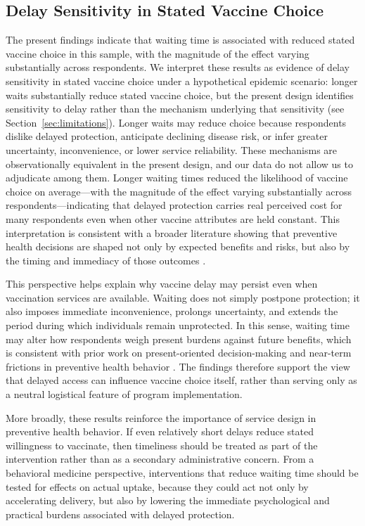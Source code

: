 \documentclass[12pt]{article}
\begin{document}
\subsection{Delay Sensitivity in Stated Vaccine Choice}

The present findings indicate that waiting time is associated with reduced stated vaccine choice in this sample, with the magnitude of the effect varying substantially across respondents. We interpret these results as evidence of delay sensitivity in stated vaccine choice under a hypothetical epidemic scenario: longer waits substantially reduce stated vaccine choice, but the present design identifies sensitivity to delay rather than the mechanism underlying that sensitivity (see Section~\ref{sec:limitations}). Longer waits may reduce choice because respondents dislike delayed protection, anticipate declining disease risk, or infer greater uncertainty, inconvenience, or lower service reliability. These mechanisms are observationally equivalent in the present design, and our data do not allow us to adjudicate among them. Longer waiting times reduced the likelihood of vaccine choice on average---with the magnitude of the effect varying substantially across respondents---indicating that delayed protection carries real perceived cost for many respondents even when other vaccine attributes are held constant. This interpretation is consistent with a broader literature showing that preventive health decisions are shaped not only by expected benefits and risks, but also by the timing and immediacy of those outcomes \parencite{AttemaBrouwer2013,AttemaEtAl2018}.

This perspective helps explain why vaccine delay may persist even when vaccination services are available. Waiting does not simply postpone protection; it also imposes immediate inconvenience, prolongs uncertainty, and extends the period during which individuals remain unprotected. In this sense, waiting time may alter how respondents weigh present burdens against future benefits, which is consistent with prior work on present-oriented decision-making and near-term frictions in preventive health behavior \parencite{Laibson1997,ODonoghueRabin1999,BrewerEtAl2017,JohnsonEtAl2013}. The findings therefore support the view that delayed access can influence vaccine choice itself, rather than serving only as a neutral logistical feature of program implementation.

More broadly, these results reinforce the importance of service design in preventive health behavior. If even relatively short delays reduce stated willingness to vaccinate, then timeliness should be treated as part of the intervention rather than as a secondary administrative concern. From a behavioral medicine perspective, interventions that reduce waiting time should be tested for effects on actual uptake, because they could act not only by accelerating delivery, but also by lowering the immediate psychological and practical burdens associated with delayed protection.
\end{document}
